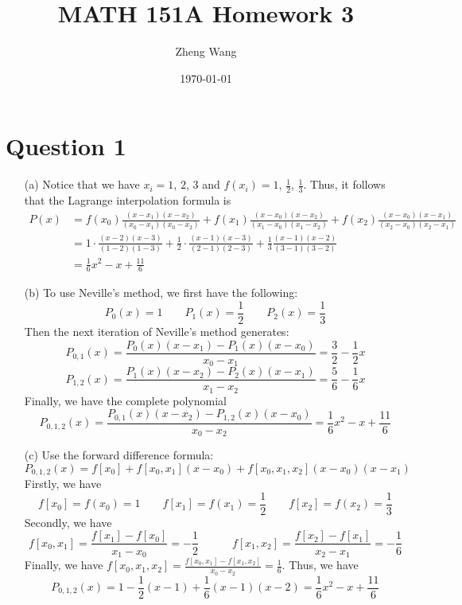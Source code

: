 \documentclass[11pt]{article}
\author{Zheng Wang}
\date{\today}
\title{MATH 151A Homework 3}
\begin{document}
\maketitle

\section*{Question 1}
\begin{itemize}
	
	\item [(a)]
	Notice that we have $ x_i = 1 $, $ 2 $, $ 3 $ and $ f(x_i) = 1 $, $ \frac{1}{2} $, $ \frac{1}{3} $. Thus, it follows that the Lagrange interpolation formula is
	\begin{equation*}
	\begin{aligned}
	P(x) &= f(x_0)\frac{(x-x_1)(x-x_2)}{(x_0-x_1)(x_0-x_2)} + f(x_1)\frac{(x-x_0)(x-x_2)}{(x_1-x_0)(x_1-x_2)} + f(x_2)\frac{(x-x_0)(x-x_1)}{(x_2-x_0)(x_2-x_1)}\\
	&= 1 \cdot \frac{(x-2)(x-3)}{(1-2)(1-3)} + \frac{1}{2}\cdot\frac{(x-1)(x-3)}{(2-1)(2-3)} + \frac{1}{3}\frac{(x-1)(x-2)}{(3-1)(3-2)}\\
	& = \frac{1}{6}x^2-x+\frac{11}{6}
	\end{aligned}
	\end{equation*}
	\item [(b)]
	To use Neville's method, we first have the following:
	\[ P_0(x) = 1 \quad\quad P_1(x) = \frac{1}{2} \quad\quad P_2(x) = \frac{1}{3} \]
	Then the next iteration of Neville's method generates:
	\[ P_{0,1}(x) = \frac{P_0(x)(x-x_1) - P_1(x)(x-x_0)}{x_0 - x_1} = \frac{3}{2} - \frac{1}{2}x\]
	\[ P_{1,2}(x) = \frac{P_1(x)(x-x_2) - P_2(x)(x-x_1)}{x_1 - x_2} = \frac{5}{6} - \frac{1}{6}x \]
	Finally, we have the complete polynomial
	\[ P_{0,1,2}(x) = \frac{P_{0,1}(x)(x-x_2)-  P_{1,2}(x)(x-x_0)}{x_0-x_2} = \frac{1}{6}x^2-x+\frac{11}{6} \]
	\item[(c)]
	Use the forward difference formula:
	\[ P_{0,1,2}(x) = f[x_0] + f[x_0,x_1](x-x_0) + f[x_0,x_1,x_2](x-x_0)(x-x_1) \]
	Firstly, we have\[ f[x_0] = f(x_0) = 1 \quad\quad f[x_1] = f(x_1) = \frac{1}{2} \quad\quad f[x_2] = f(x_2) = \frac{1}{3} \]
	Secondly, we have \[ f[x_0, x_1] = \frac{f[x_1] - f[x_0]}{x_1 - x_0} = -\frac{1}{2} \quad\quad\quad f[x_1,x_2] = \frac{f[x_2] - f[x_1]}{x_2 - x_1} = -\frac{1}{6}\]
	Finally, we have $ f[x_0,x_1,x_2] = \frac{f[x_0,x_1] - f[x_1,x_2]}{x_0 - x_2} = \frac{1}{6}$. Thus, we have 
	\[ P_{0,1,2}(x) = 1  - \frac{1}{2}(x-1) + \frac{1}{6}(x-1)(x-2) =  \frac{1}{6}x^2-x+\frac{11}{6}  \]
\end{itemize}
\end{document}
